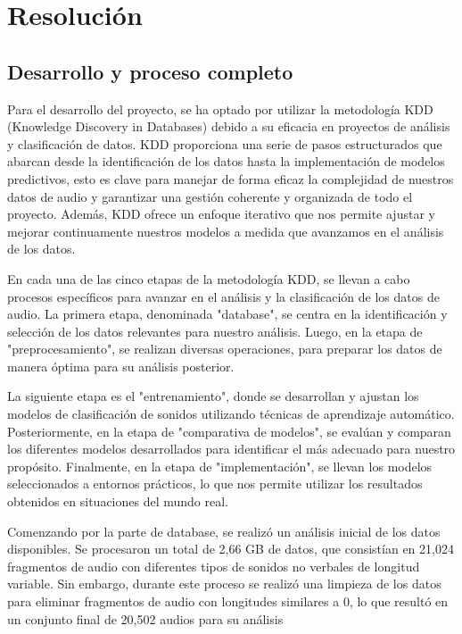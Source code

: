 
\section{Resolución}

\subsection{Desarrollo y proceso completo}

Para el desarrollo del proyecto, se ha optado por utilizar la metodología KDD (Knowledge Discovery in Databases) debido a su eficacia en proyectos de análisis y clasificación de datos. KDD proporciona una serie de pasos estructurados que abarcan desde la identificación de los datos hasta la implementación de modelos predictivos, esto es clave para manejar de forma eficaz la complejidad de nuestros datos de audio y garantizar una gestión coherente y organizada de todo el proyecto. Además, KDD ofrece un enfoque iterativo que nos permite ajustar y mejorar continuamente nuestros modelos a medida que avanzamos en el análisis de los datos.  

En cada una de las cinco etapas de la metodología KDD, se llevan a cabo procesos específicos para avanzar en el análisis y la clasificación de los datos de audio. La primera etapa, denominada "database", se centra en la identificación y selección de los datos relevantes para nuestro análisis. Luego, en la etapa de "preprocesamiento", se realizan diversas operaciones, para preparar los datos de manera óptima para su análisis posterior. 

La siguiente etapa es el "entrenamiento", donde se desarrollan y ajustan los modelos de clasificación de sonidos utilizando técnicas de aprendizaje automático. Posteriormente, en la etapa de "comparativa de modelos", se evalúan y comparan los diferentes modelos desarrollados para identificar el más adecuado para nuestro propósito. Finalmente, en la etapa de "implementación", se llevan los modelos seleccionados a entornos prácticos, lo que nos permite utilizar los resultados obtenidos en situaciones del mundo real.

Comenzando por la parte de database, se realizó un análisis inicial de los datos disponibles. Se procesaron un total de 2,66 GB de datos, que consistían en 21,024 fragmentos de audio con diferentes tipos de sonidos no verbales de longitud variable. Sin embargo, durante este proceso se realizó una limpieza de los datos para eliminar fragmentos de audio con longitudes similares a 0, lo que resultó en un conjunto final de 20,502 audios para su análisis 

